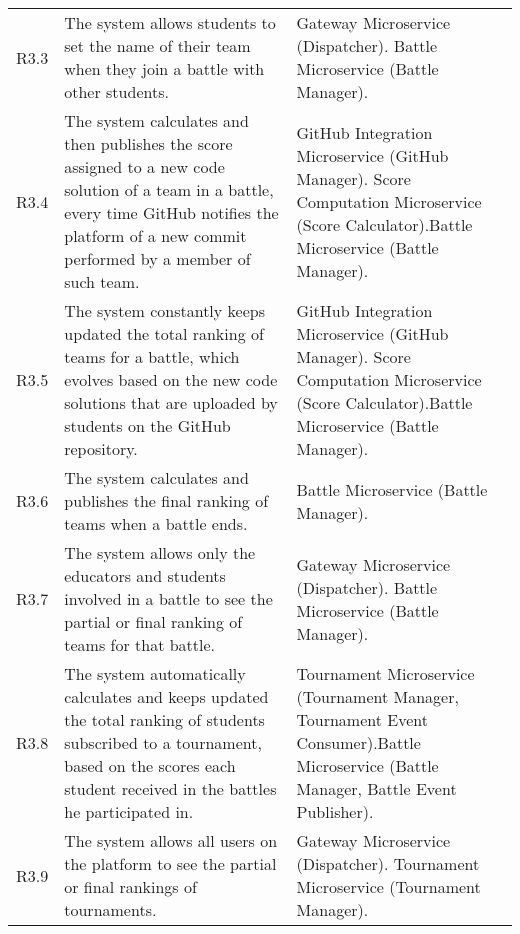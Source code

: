 \begin{longtable}{p{1cm} p{5.5cm} p{6cm}}
 	R3.3 & The system allows students to set the name of their team when they join a battle with other students. & Gateway Microservice (Dispatcher). \newline Battle Microservice (Battle Manager).\\
 	
 	R3.4 & The system calculates and then publishes the score assigned to a new code solution of a team in a battle, every time GitHub notifies the platform of a new commit performed by a member	of such team. & GitHub Integration Microservice (GitHub Manager). \newline Score Computation Microservice (Score Calculator).\newline Battle Microservice (Battle Manager).\\
 	
 	R3.5 & The system constantly keeps updated the total ranking of teams for a battle, which evolves	based on the new code solutions that are uploaded by students on the GitHub repository. & GitHub Integration Microservice (GitHub Manager). \newline Score Computation Microservice (Score Calculator).\newline Battle Microservice (Battle Manager).\\
 	
 	R3.6 & The system calculates and publishes the final ranking of teams when a battle ends. & Battle Microservice (Battle Manager).\\
 	
 	R3.7 & The system allows only the educators and students involved in a battle to see the partial or 	final ranking of teams for that battle. & Gateway Microservice (Dispatcher). \newline Battle Microservice (Battle Manager).\\
 	
 	R3.8 & The system automatically calculates and keeps updated the total ranking of students subscribed to a tournament, based on the scores each student received in the battles he participated in. & Tournament Microservice (Tournament Manager, Tournament Event Consumer).\newline Battle Microservice (Battle Manager, Battle Event Publisher).\\
 	
 	R3.9 & The system allows all users on the platform to see the partial or final rankings of tournaments. & Gateway Microservice (Dispatcher). \newline Tournament Microservice (Tournament Manager).\\
 	

\end{longtable}
